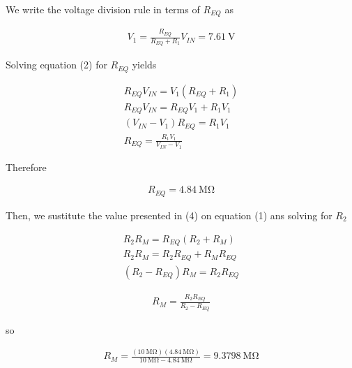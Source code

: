 \documentclass{article}
\begin{document}
	We write the voltage division rule in terms of $R_{EQ}$ as
	
	\begin{align}
		V_1 = \frac{R_{EQ}}{R_{EQ} + R_1} V_{IN} = \qty{7.61}{\volt}
	\end{align}
	
	Solving equation (2) for $R_{EQ}$ yields
	
	\begin{align}
		R_{EQ}V_{IN} = 	V_1(R_{EQ} + R_1) \nonumber \\
		R_{EQ}V_{IN} = R_{EQ}V_1 + R_1V_1 \nonumber \\
		(V_{IN} - V_1)R_{EQ} = R_1V_1 \nonumber \\
		R_{EQ} = \frac{R_1V_1}{V_{IN} - V_1} 
	\end{align}
	
	Therefore
	
	\begin{align}
		R_{EQ} = \qty{4.84}{\mega\ohm}
	\end{align}
	 
	Then, we sustitute the value presented in (4) on equation (1) ans solving for $R_2$
	
	\begin{align}
		R_2R_M = R_{EQ}(R_2 + R_M) \nonumber \\
		R_2R_M = R_2R_{EQ} + R_MR_{EQ} \nonumber \\
		(R_2 - R_{EQ})R_M = R_2R_{EQ} \nonumber
	\end{align}
	 
	 \begin{align}
	 	R_M = \frac{R_2R_{EQ}}{R_2 - R_{EQ}}
	 \end{align}

so

\begin{align}
	R_M = \frac{(\qty{10}{\mega\ohm}) (\qty{4.84}{\mega\ohm})}{\qty{10}{\mega\ohm} - \qty{4.84}{\mega\ohm}} = \qty{9.3798}{\mega\ohm}
\end{align}
	
\end{document}
